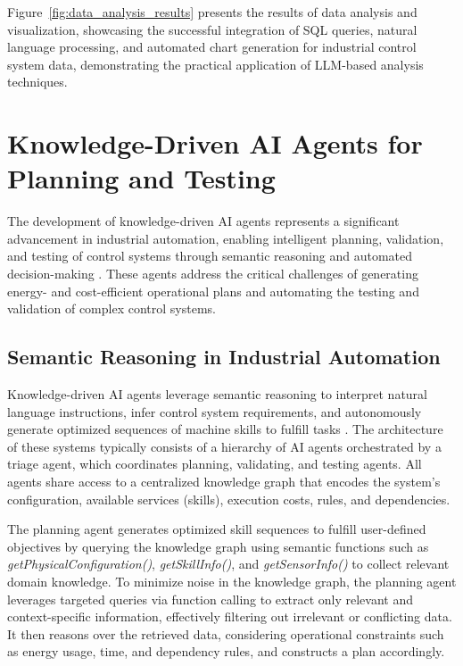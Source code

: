 Figure~\ref{fig:data_analysis_results} presents the results of data analysis and visualization, showcasing the successful integration of SQL queries, natural language processing, and automated chart generation for industrial control system data, demonstrating the practical application of LLM-based analysis techniques.

\section{Knowledge-Driven AI Agents for Planning and Testing}

The development of knowledge-driven AI agents represents a significant advancement in industrial automation, enabling intelligent planning, validation, and testing of control systems through semantic reasoning and automated decision-making \cite{rakholia2024advancing}. These agents address the critical challenges of generating energy- and cost-efficient operational plans and automating the testing and validation of complex control systems.

\subsection{Semantic Reasoning in Industrial Automation}

Knowledge-driven AI agents leverage semantic reasoning to interpret natural language instructions, infer control system requirements, and autonomously generate optimized sequences of machine skills to fulfill tasks \cite{shilov2020ontologies}. The architecture of these systems typically consists of a hierarchy of AI agents orchestrated by a triage agent, which coordinates planning, validating, and testing agents. All agents share access to a centralized knowledge graph that encodes the system's configuration, available services (skills), execution costs, rules, and dependencies.

The planning agent generates optimized skill sequences to fulfill user-defined objectives by querying the knowledge graph using semantic functions such as \textit{getPhysicalConfiguration()}, \textit{getSkillInfo()}, and \textit{getSensorInfo()} to collect relevant domain knowledge. To minimize noise in the knowledge graph, the planning agent leverages targeted queries via function calling to extract only relevant and context-specific information, effectively filtering out irrelevant or conflicting data. It then reasons over the retrieved data, considering operational constraints such as energy usage, time, and dependency rules, and constructs a plan accordingly.

